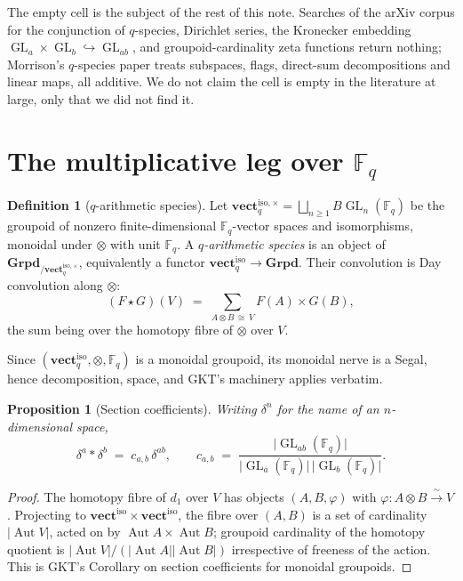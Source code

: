 \documentclass[11pt,a4paper]{article}
\newtheorem{proposition}[theorem]{Proposition}
\theoremstyle{definition}
\newtheorem{definition}[theorem]{Definition}
\theoremstyle{remark}
\newcommand{\FF}{\mathbb{F}}
\newcommand{\cat}[1]{\mathbf{#1}}
\newcommand{\Grpd}{\cat{Grpd}}
\newcommand{\vect}{\cat{vect}}
\DeclareMathOperator{\GL}{GL}
\DeclareMathOperator{\Aut}{Aut}
\newcommand{\norm}[1]{\lvert #1 \rvert}
\newcommand{\iso}{\mathrm{iso}}
\begin{document}
The empty cell is the subject of the rest of this note. Searches of the arXiv corpus for
the conjunction of $q$-species, Dirichlet series, the Kronecker embedding $\GL_a \times
\GL_b \hookrightarrow \GL_{ab}$, and groupoid-cardinality zeta functions return nothing;
Morrison's $q$-species paper \cite{Morrison} treats subspaces, flags, direct-sum
decompositions and linear maps, all additive. We do not claim the cell is empty in the
literature at large, only that we did not find it.

\section{The multiplicative leg over \texorpdfstring{$\FF_q$}{Fq}}\label{sec:tensor}

\begin{definition}[$q$-arithmetic species]
Let $\vect_q^{\iso,\times} = \bigsqcup_{n\ge1} B\GL_n(\FF_q)$ be the groupoid of nonzero
finite-dimensional $\FF_q$-vector spaces and isomorphisms, monoidal under $\otimes$ with
unit $\FF_q$. A \emph{$q$-arithmetic species} is an object of
$\Grpd_{/\vect_q^{\iso,\times}}$, equivalently a functor $\vect_q^{\iso} \to \Grpd$. Their
convolution is Day convolution along $\otimes$:
\[
  (F \star G)(V) \;=\; \sum_{A \otimes B \,\cong\, V} F(A) \times G(B),
\]
the sum being over the homotopy fibre of $\otimes$ over $V$.
\end{definition}

Since $(\vect_q^{\iso},\otimes,\FF_q)$ is a monoidal groupoid, its monoidal nerve is a
Segal, hence decomposition, space, and GKT's machinery applies verbatim.

\begin{proposition}[Section coefficients]\label{prop:sect}
Writing $\delta^n$ for the name of an $n$-dimensional space,
\[
  \delta^a * \delta^b \;=\; c_{a,b}\,\delta^{ab},
  \qquad
  c_{a,b} \;=\; \frac{\norm{\GL_{ab}(\FF_q)}}{\norm{\GL_a(\FF_q)}\,\norm{\GL_b(\FF_q)}}.
\]
\end{proposition}

\begin{proof}
The homotopy fibre of $d_1$ over $V$ has objects $(A,B,\varphi)$ with $\varphi : A \otimes
B \xrightarrow{\ \sim\ } V$. Projecting to $\vect^{\iso}\times\vect^{\iso}$, the fibre over
$(A,B)$ is a set of cardinality $\norm{\Aut V}$, acted on by $\Aut A \times \Aut B$;
groupoid cardinality of the homotopy quotient is $\norm{\Aut V}/(\norm{\Aut A}\norm{\Aut
B})$ irrespective of freeness of the action. This is GKT's Corollary on section
coefficients for monoidal groupoids.
\end{proof}
\end{document}
